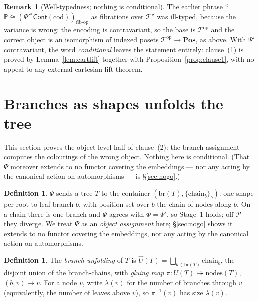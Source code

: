 \documentclass[11pt]{article}
\theoremstyle{definition}
\newtheorem{definition}[theorem]{Definition}
\newtheorem{remark}[theorem]{Remark}
\newcommand{\Pos}{\mathbf{Pos}}
\newcommand{\Cont}{\mathsf{Cont}}
\newcommand{\cod}{\mathrm{cod}}
\newcommand{\nodes}{\mathrm{nodes}}
\newcommand{\branches}{\mathrm{br}}
\newcommand{\op}{\mathrm{op}}
\newcommand{\Tree}{\mathcal{T}}
\newcommand{\Path}{\mathcal{P}}
\newcommand{\Pfib}{\mathbb{P}}
\newcommand{\Uf}{\widehat{U}}
\newcommand{\Psip}{\Psi'}
\begin{document}
\begin{remark}[Well-typedness; nothing is conditional]\label{rem:welltyped}
The earlier phrase ``$\Pfib\cong(\Psip{}^*\Cont(\cod))_{\mathrm{fib\text{-}op}}$ as fibrations over
$\Tree$'' was ill-typed, because the variance is wrong: the encoding is contravariant, so the base
is $\Tree^\op$ and the correct object is an isomorphism of indexed posets $\Tree^\op\to\Pos$, as
above. With $\Psip$ contravariant, the word \emph{conditional} leaves the statement entirely:
clause~(1) is proved by Lemma~\ref{lem:cartlift} together with Proposition~\ref{prop:clause1}, with
no appeal to any external cartesian-lift theorem.
\end{remark}

\section{Branches as shapes unfolds the tree}\label{sec:unfolding}

This section proves the object-level half of clause~(2): the branch assignment computes the
colourings of the wrong object. Nothing here is conditional. (That $\Psi$ moreover extends to no
functor covering the embeddings --- nor any acting by the canonical action on automorphisms --- is
\S\ref{sec:nogo}.)

\begin{definition}\label{def:psi}
$\Psi$ sends a tree $T$ to the container $(\branches(T),\{\mathrm{chain}_b\}_b)$: one shape per
root-to-leaf branch $b$, with position set over $b$ the chain of nodes along $b$. On a chain there
is one branch and $\Psi$ agrees with $\Phi=\Psip$, so Stage~1 holds; off $\Path$ they diverge. We
treat $\Psi$ as an \emph{object assignment} here; \S\ref{sec:nogo} shows it extends to no functor
covering the embeddings, nor any acting by the canonical action on automorphisms.
\end{definition}

\begin{definition}\label{def:unfolding}
The \emph{branch-unfolding} of $T$ is $\Uf(T)=\bigsqcup_{b\in\branches(T)}\mathrm{chain}_b$, the
disjoint union of the branch-chains, with \emph{gluing map}
$\pi\colon\Uf(T)\twoheadrightarrow\nodes(T)$, $(b,v)\mapsto v$. For a node $v$, write $\lambda(v)$
for the number of branches through $v$ (equivalently, the number of leaves above $v$), so
$\pi^{-1}(v)$ has size $\lambda(v)$.
\end{definition}
\end{document}
